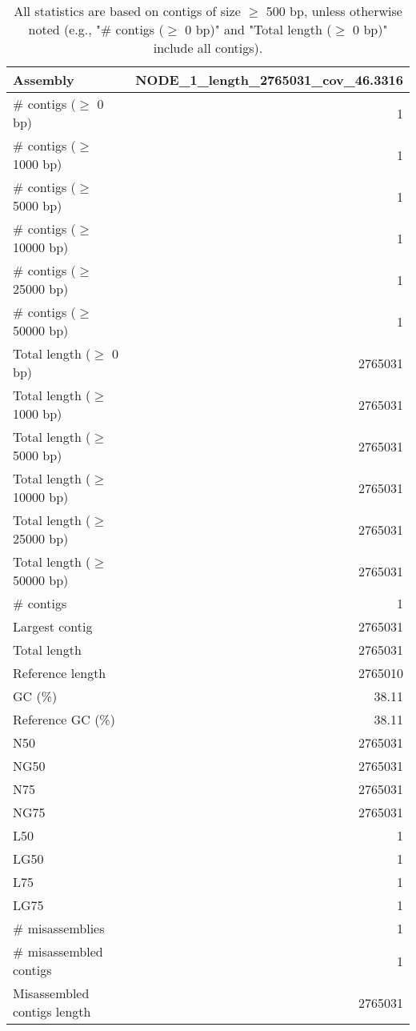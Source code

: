 \documentclass[12pt,a4paper]{article}
\begin{document}
\begin{table}[ht]
\begin{center}
\caption{All statistics are based on contigs of size $\geq$ 500 bp, unless otherwise noted (e.g., "\# contigs ($\geq$ 0 bp)" and "Total length ($\geq$ 0 bp)" include all contigs).}
\begin{tabular}{|l*{1}{|r}|}
\hline
Assembly & NODE\_1\_length\_2765031\_cov\_46.3316 \\ \hline
\# contigs ($\geq$ 0 bp) & 1 \\ \hline
\# contigs ($\geq$ 1000 bp) & 1 \\ \hline
\# contigs ($\geq$ 5000 bp) & 1 \\ \hline
\# contigs ($\geq$ 10000 bp) & 1 \\ \hline
\# contigs ($\geq$ 25000 bp) & 1 \\ \hline
\# contigs ($\geq$ 50000 bp) & 1 \\ \hline
Total length ($\geq$ 0 bp) & 2765031 \\ \hline
Total length ($\geq$ 1000 bp) & 2765031 \\ \hline
Total length ($\geq$ 5000 bp) & 2765031 \\ \hline
Total length ($\geq$ 10000 bp) & 2765031 \\ \hline
Total length ($\geq$ 25000 bp) & 2765031 \\ \hline
Total length ($\geq$ 50000 bp) & 2765031 \\ \hline
\# contigs & 1 \\ \hline
Largest contig & 2765031 \\ \hline
Total length & 2765031 \\ \hline
Reference length & 2765010 \\ \hline
GC (\%) & 38.11 \\ \hline
Reference GC (\%) & 38.11 \\ \hline
N50 & 2765031 \\ \hline
NG50 & 2765031 \\ \hline
N75 & 2765031 \\ \hline
NG75 & 2765031 \\ \hline
L50 & 1 \\ \hline
LG50 & 1 \\ \hline
L75 & 1 \\ \hline
LG75 & 1 \\ \hline
\# misassemblies & 1 \\ \hline
\# misassembled contigs & 1 \\ \hline
Misassembled contigs length & 2765031 \\ \hline

\end{tabular}
\end{center}
\end{table}
\end{document}
